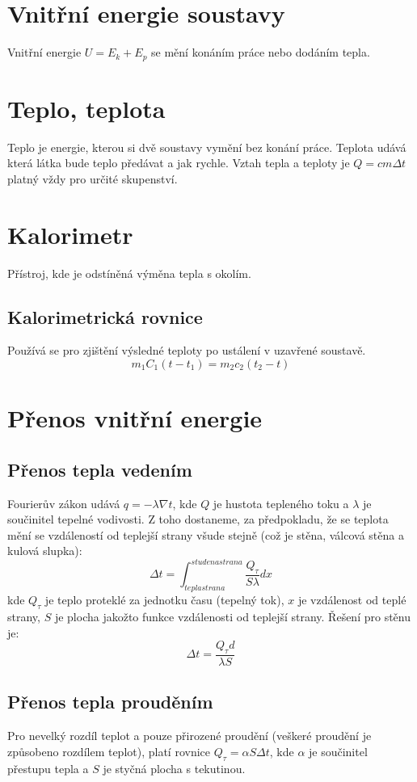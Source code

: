 \documentclass[titlepage]{book}
\begin{document}
\section{Vnitřní energie soustavy}
Vnitřní energie $U = E_k + E_p$ se mění konáním práce nebo dodáním tepla.
\section{Teplo, teplota}
Teplo je energie, kterou si dvě soustavy vymění bez konání práce. Teplota udává která látka bude teplo předávat a jak rychle. Vztah tepla a teploty je $Q = cm\Delta t$ platný vždy pro určité skupenství.
\section{Kalorimetr}
Přístroj, kde je odstíněná výměna tepla s okolím.
\subsection{Kalorimetrická rovnice}
Používá se pro zjištění výsledné teploty po ustálení v uzavřené soustavě.\\
\begin{equation}
m_1C_1(t-t_1) = m_2c_2(t_2-t)
\end{equation}
\section{Přenos vnitřní energie}
\subsection{Přenos tepla vedením}
Fourierův zákon udává $q = -\lambda \nabla t$, kde $Q$ je hustota tepleného toku a $\lambda$ je součinitel tepelné vodivosti. Z toho dostaneme, za předpokladu, že se teplota mění se vzdáleností od teplejší strany všude stejně (což je stěna, válcová stěna a kulová slupka):
\begin{equation}
\Delta t = \int_{tepla strana}^{studena strana} \frac{Q_{\tau}}{S \lambda} dx
\end{equation}
kde $Q_{\tau}$ je teplo proteklé za jednotku času (tepelný tok), $x$ je vzdálenost od teplé strany, $S$ je plocha jakožto funkce vzdálenosti od teplejší strany. Řešení pro stěnu je:
\begin{equation}
\Delta t = \frac{Q_{\tau}d}{\lambda S}
\end{equation}
\subsection{Přenos tepla prouděním}
Pro nevelký rozdíl teplot a pouze přirozené proudění (veškeré proudění je způsobeno rozdílem teplot), platí rovnice $Q_{\tau} = \alpha S \Delta t$, kde $\alpha$ je součinitel přestupu tepla a $S$ je styčná plocha s tekutinou.
\end{document}
